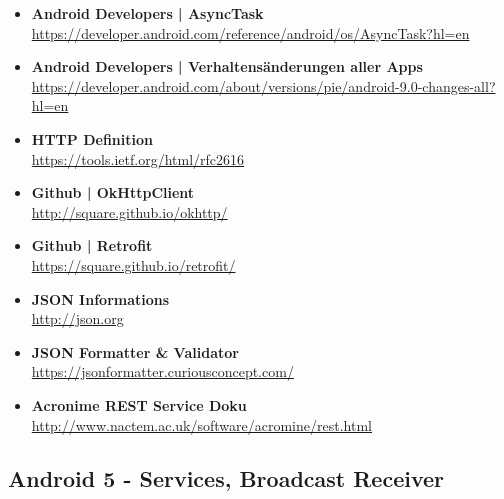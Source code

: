 \documentclass[a4paper]{article}
\begin{document}
{\begin{itemize}
		\item \textbf{Android Developers | AsyncTask}\\
		\href{https://developer.android.com/reference/android/os/AsyncTask?hl=en}
		{https://developer.android.com/reference/android/os/AsyncTask?hl=en}
		
		\item \textbf{Android Developers | Verhaltensänderungen aller Apps}\\
		\href{https://developer.android.com/about/versions/pie/android-9.0-changes-all?hl=en}
		{https://developer.android.com/about/versions/pie/android-9.0-changes-all?hl=en}
		
		\item \textbf{HTTP Definition}\\
		\href{https://tools.ietf.org/html/rfc2616}
		{https://tools.ietf.org/html/rfc2616}
		
		\item \textbf{Github | OkHttpClient}\\
		\href{http://square.github.io/okhttp/}
		{http://square.github.io/okhttp/}
		
		\item \textbf{Github | Retrofit}\\
		\href{https://square.github.io/retrofit/}
		{https://square.github.io/retrofit/}
		
		\item \textbf{JSON Informations}\\
		\href{http://json.org}
		{http://json.org}
		
		\item \textbf{JSON Formatter \& Validator}\\
		\href{https://jsonformatter.curiousconcept.com/}
		{https://jsonformatter.curiousconcept.com/}
		
		\item \textbf{Acronime REST Service Doku}\\
		\href{http://www.nactem.ac.uk/software/acromine/rest.html}
		{http://www.nactem.ac.uk/software/acromine/rest.html}
		
	\end{itemize}
	
	\subsection{Android 5 - Services, Broadcast Receiver}
	
	\begin{itemize}
		

\end{itemize}}
\end{document}
